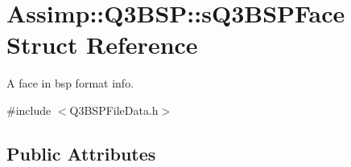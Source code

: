 \hypertarget{struct_assimp_1_1_q3_b_s_p_1_1s_q3_b_s_p_face}{\section{Assimp\+:\+:Q3\+B\+S\+P\+:\+:s\+Q3\+B\+S\+P\+Face Struct Reference}
\label{struct_assimp_1_1_q3_b_s_p_1_1s_q3_b_s_p_face}
}


A face in bsp format info.  




{\ttfamily \#include $<$Q3\+B\+S\+P\+File\+Data.\+h$>$}

\subsection*{Public Attributes}
